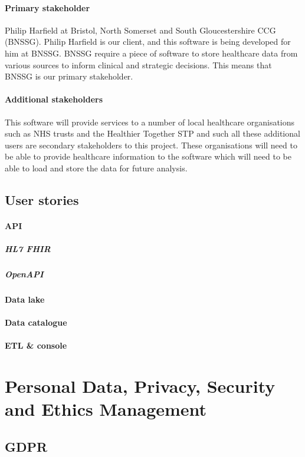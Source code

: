 \documentclass[10pt]{article}
\begin{document}
\paragraph{Primary stakeholder}
Philip Harfield at Bristol, North Somerset and South Gloucestershire CCG (BNSSG). Philip Harfield is our client, and this software is being developed for him at BNSSG. BNSSG require a piece of software to store healthcare data from various sources to inform clinical and strategic decisions. This means that BNSSG is our primary stakeholder.
\paragraph{Additional stakeholders}
This software will provide services to a number of local healthcare organisations such as NHS trusts and the Healthier Together STP and such all these additional users are secondary stakeholders to this project. These organisations will need to be able to provide healthcare information to the software which will need to be able to load and store the data for future analysis.

\subsection{User stories}
\paragraph{API}
\subparagraph{HL7 FHIR}
\subparagraph{OpenAPI}

\paragraph{Data lake}
\paragraph{Data catalogue}
\paragraph{ETL \& console}


\section{Personal Data, Privacy, Security and Ethics Management}
\subsection{GDPR}
\end{document}

